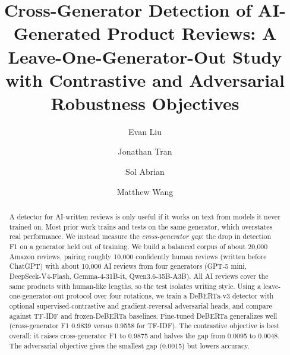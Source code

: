 \documentclass[manuscript,nonacm]{acmart}
\begin{document}
\title[Cross-Generator Detection of AI-Generated Product Reviews]{Cross-Generator
Detection of AI-Generated Product Reviews: A Leave-One-Generator-Out Study with
Contrastive and Adversarial Robustness Objectives}

\author{Evan Liu}

\author{Jonathan Tran}

\author{Sol Abrian}

\author{Matthew Wang}

\renewcommand{\shortauthors}{Liu et al.}

\begin{abstract}
A detector for AI-written reviews is only useful if it works on text from models
it never trained on. Most prior work trains and tests on the same generator,
which overstates real performance. We instead measure the \emph{cross-generator
gap}: the drop in detection F1 on a generator held out of training. We build a
balanced corpus of about 20{,}000 Amazon reviews, pairing roughly 10{,}000
confidently human reviews (written before ChatGPT) with about 10{,}000 AI
reviews from four generators (GPT-5 mini, DeepSeek-V4-Flash, Gemma-4-31B-it,
Qwen3.6-35B-A3B). All AI reviews cover the same products with human-like lengths,
so the test isolates writing style. Using a leave-one-generator-out protocol over
four rotations, we train a DeBERTa-v3 detector with optional
supervised-contrastive and gradient-reversal adversarial heads, and compare
against TF-IDF and frozen-DeBERTa baselines. Fine-tuned DeBERTa generalizes well
(cross-generator F1 0.9839 versus 0.9558 for TF-IDF). The contrastive objective
is best overall: it raises cross-generator F1 to 0.9875 and halves the gap from
0.0095 to 0.0048. The adversarial objective gives the smallest gap (0.0015) but
lowers accuracy.
\end{abstract}
\end{document}

